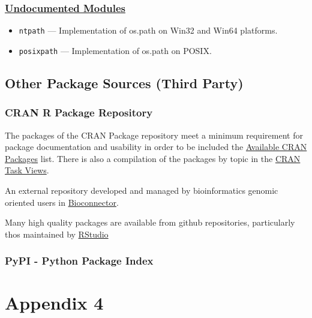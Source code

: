 \documentclass[]{book}
\providecommand{\tightlist}{%
  \setlength{\itemsep}{0pt}\setlength{\parskip}{0pt}}
\theoremstyle{definition}
\theoremstyle{definition}
\theoremstyle{definition}
\theoremstyle{remark}
\begin{document}
\subsection{\texorpdfstring{\href{https://docs.python.org/3.7/library/undoc.html}{Undocumented
Modules}}{Undocumented Modules}}\label{undocumented-modules}

\begin{itemize}
\tightlist
\item
  \texttt{ntpath} --- Implementation of os.path on Win32 and Win64
  platforms.
\item
  \texttt{posixpath} --- Implementation of os.path on POSIX.
\end{itemize}

\section{Other Package Sources (Third
Party)}\label{other-package-sources-third-party}

\subsection{CRAN R Package Repository}\label{cran-r-package-repository}

The packages of the CRAN Package repository meet a minimum requirement
for package documentation and usability in order to be included the
\href{https://cran.cnr.berkeley.edu/web/packages/index.html}{Available
CRAN Packages} list. There is also a compilation of the packages by
topic in the \href{https://cran.cnr.berkeley.edu/web/views/}{CRAN Task
Views}.

An external repository developed and managed by bioinformatics genomic
oriented users in \href{https://www.bioconductor.org/}{Bioconnector}.

Many high quality packages are available from github repositories,
particularly thos maintained by
\href{https://www.rstudio.com/products/rpackages/}{RStudio}

\subsection{PyPI - Python Package
Index}\label{pypi---python-package-index}

\chapter{Appendix 4}\label{appendix-4}
\end{document}
